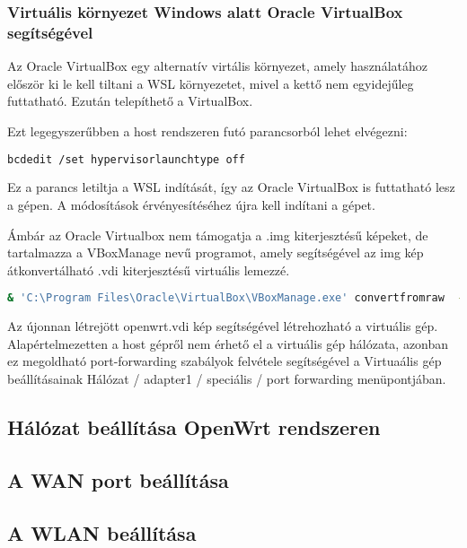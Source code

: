 \documentclass[12pt]{article}
\begin{document}
\subsubsection{Virtuális környezet Windows alatt Oracle VirtualBox segítségével}

Az Oracle VirtualBox egy alternatív virtális környezet, amely használatához először ki le kell tiltani a WSL környezetet, mivel a kettő nem egyidejűleg futtatható. Ezután telepíthető a VirtualBox.

Ezt legegyszerűbben a host rendszeren futó parancsorból lehet elvégezni:

\begin{lstlisting}[language=Bash]
    bcdedit /set hypervisorlaunchtype off
\end{lstlisting}


Ez a parancs letiltja a WSL indítását, így az Oracle VirtualBox is futtatható lesz a gépen. A módosítások érvényesítéséhez újra kell indítani a gépet. \cite*{virtualbox_and_wsl}

Ámbár az Oracle Virtualbox nem támogatja a .img kiterjesztésű képeket, de tartalmazza a VBoxManage nevű programot, amely segítségével az img kép átkonvertálható .vdi kiterjesztésű virtuális lemezzé.

\begin{lstlisting}[language=Bash]
    & 'C:\Program Files\Oracle\VirtualBox\VBoxManage.exe' convertfromraw  --format VDI '.\openwrt-22.03.3-x86-64-generic-ext4-combined.img' '.\openwrt.vdi'
\end{lstlisting}

Az újonnan létrejött openwrt.vdi kép segítségével létrehozható a virtuális gép. Alapértelmezetten a host gépről nem érhető el a virtuális gép hálózata, azonban ez megoldható port-forwarding szabályok felvétele segítségével a Virtuaális gép beállításainak Hálózat / adapter1 / speciális / port forwarding menüpontjában.

\subsection{Hálózat beállítása OpenWrt rendszeren}

\subsection{A WAN port beállítása}

\subsection{A WLAN beállítása}
\end{document}
